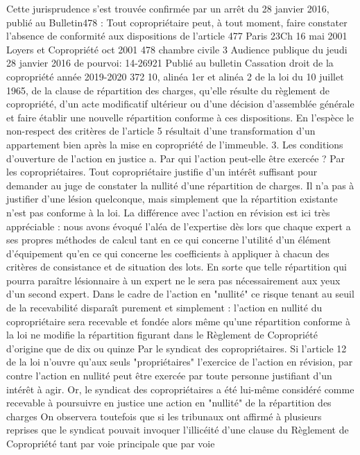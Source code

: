 Cette jurisprudence s’est trouvée confirmée par un arrêt du 28 janvier 2016, publié au Bulletin478 : Tout copropriétaire peut, à tout moment, faire constater l'absence de conformité aux dispositions de l'article
477 Paris 23\degres Ch 16 mai 2001 Loyers et Copropriété oct 2001 
478 chambre civile 3 Audience publique du jeudi 28 janvier 2016 \no de pourvoi: 14-26921 Publié au bulletin Cassation
droit de la copropriété année 2019-2020
372
10, alinéa 1er et alinéa 2 de la loi du 10 juillet 1965, de la clause de répartition des charges, qu'elle résulte du règlement de copropriété, d'un acte modificatif ultérieur ou d'une décision d'assemblée générale et faire établir une nouvelle répartition conforme à ces dispositions. En l’espèce le non-respect des critères de l’article 5 résultait d’une transformation d’un appartement bien après la mise en copropriété de l’immeuble.
3. Les conditions d’ouverture de l’action en justice
a. Par qui l'action peut-elle être exercée ?
Par les copropriétaires.
Tout copropriétaire justifie d'un intérêt suffisant pour demander au juge de constater la nullité d'une répartition de charges. Il n'a pas à justifier d'une lésion quelconque, mais simplement que la répartition existante n'est pas conforme à la loi.
La différence avec l'action en révision est ici très appréciable : nous avons évoqué l'aléa de l'expertise dès lors que chaque expert a ses propres méthodes de calcul tant en ce qui concerne l'utilité d'un élément d'équipement qu'en ce qui concerne les coefficients à appliquer à chacun des critères de consistance et de situation des lots.
En sorte que telle répartition qui pourra paraître lésionnaire à un expert ne le sera pas nécessairement aux yeux d'un second expert.
Dans le cadre de l'action en "nullité" ce risque tenant au seuil de la recevabilité disparaît purement et simplement : l'action en nullité du copropriétaire sera recevable et fondée alors même qu'une répartition conforme à la loi ne modifie la répartition figurant dans le Règlement de Copropriété d'origine que de dix ou quinze %
Par le syndicat des copropriétaires.
Si l'article 12 de la loi n'ouvre qu'aux seuls "propriétaires" l'exercice de l'action en révision, par contre l'action en nullité peut être exercée par toute personne justifiant d'un intérêt à agir.
Or, le syndicat des copropriétaires a été lui-même considéré comme recevable à poursuivre en justice une action en "nullité" de la répartition des charges
On observera toutefois que si les tribunaux ont affirmé à plusieurs reprises que le syndicat pouvait invoquer l'illicéité d'une clause du Règlement de Copropriété tant par voie principale que par voie
